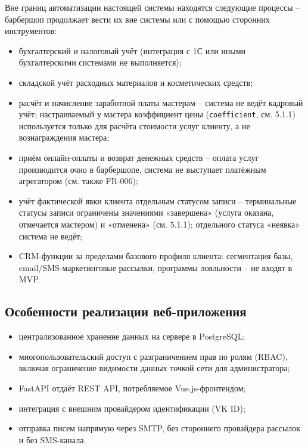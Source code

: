 Вне границ автоматизации настоящей системы находятся следующие процессы -- барбершоп продолжает вести их вне системы или с помощью сторонних инструментов:
\begin{itemize}
  \item бухгалтерский и налоговый учёт (интеграция с 1С или иными бухгалтерскими системами не выполняется);
  \item складской учёт расходных материалов и косметических средств;
  \item расчёт и начисление заработной платы мастерам -- система не ведёт кадровый учёт; настраиваемый у мастера коэффициент цены (\texttt{coefficient}, см. 5.1.1) используется только для расчёта стоимости услуг клиенту, а не вознаграждения мастера;
  \item приём онлайн-оплаты и возврат денежных средств -- оплата услуг производится очно в барбершопе, система не выступает платёжным агрегатором (см. также FR-006);
  \item учёт фактической явки клиента отдельным статусом записи -- терминальные статусы записи ограничены значениями «завершена» (услуга оказана, отмечается мастером) и «отменена» (см. 5.1.1); отдельного статуса «неявка» система не ведёт;
  \item CRM-функции за пределами базового профиля клиента: сегментация базы, email/SMS-маркетинговые рассылки, программы лояльности -- не входят в MVP.
\end{itemize}

\subsection{Особенности реализации веб-приложения}

\begin{itemize}
  \item централизованное хранение данных на сервере в PostgreSQL;
  \item многопользовательский доступ с разграничением прав по ролям (RBAC), включая ограничение видимости данных точкой сети для администратора;
  \item FastAPI отдаёт REST API, потребляемое Vue.js-фронтендом;
  \item интеграция с внешним провайдером идентификации (VK ID);
  \item отправка писем напрямую через SMTP, без стороннего провайдера рассылок и без SMS-канала.
\end{itemize}


